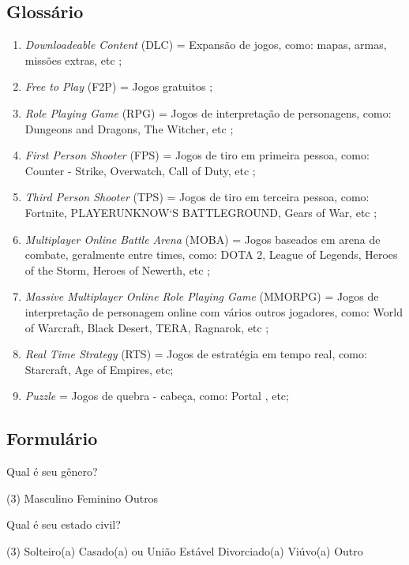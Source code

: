 \documentclass[11pt,a4paper]{article}
\begin{document}
\subsection{Glossário}

\begin{enumerate}[label=(\roman*)]
\item \textit{Downloadeable Content} (DLC) = Expansão de jogos, como: mapas, armas, missões extras, etc ;
\item \textit{Free to Play} (F2P) = Jogos gratuitos ;
\item \textit{Role Playing Game} (RPG) = Jogos de interpretação de personagens, como: Dungeons and Dragons, The Witcher, etc ;
\item \textit{First Person Shooter} (FPS) = Jogos de tiro em primeira pessoa, como: Counter - Strike, Overwatch, Call of Duty, etc ;
\item \textit{Third Person Shooter} (TPS) = Jogos de tiro em terceira pessoa, como: Fortnite, PLAYERUNKNOW`S BATTLEGROUND, Gears of War, etc ;
\item \textit{Multiplayer Online Battle Arena} (MOBA) = Jogos baseados em arena de combate, geralmente entre times, como: DOTA 2, League of Legends, Heroes of the Storm, Heroes of Newerth, etc ;
\item \textit{Massive Multiplayer Online Role Playing Game} (MMORPG) = Jogos de interpretação de personagem online com vários outros jogadores, como: World of Warcraft, Black Desert, TERA, Ragnarok, etc ;
\item \textit{Real Time Strategy} (RTS) = Jogos de estratégia em tempo real, como: Starcraft, Age of Empires, etc;
\item \textit{Puzzle} = Jogos de quebra - cabeça, como: Portal , etc;
\end{enumerate}

\subsection{Formulário}

\begin{question}
	Qual é seu gênero?
	\begin{tasks}(3)
		\task Masculino
		\task Feminino
		\task Outros
	\end{tasks}
\end{question}

\begin{question}
	Qual é seu estado civil?
	\begin{tasks}(3)
	\task Solteiro(a)
	\task Casado(a) ou União Estável
	\task Divorciado(a)
	\task Viúvo(a)
	\task Outro
	\end{tasks}
\end{question}
\end{document}
